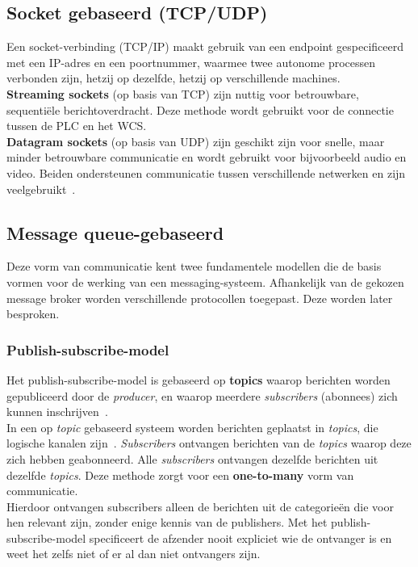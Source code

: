 \subsection{Socket gebaseerd (TCP/UDP)}
Een socket-verbinding (TCP/IP) maakt gebruik van een endpoint gespecificeerd met een IP-adres en een poortnummer, 
waarmee twee autonome processen verbonden zijn, hetzij op dezelfde, hetzij op verschillende machines.
\\
\textbf{Streaming sockets} (op basis van TCP) zijn nuttig voor betrouwbare, sequentiële berichtoverdracht.
Deze methode wordt gebruikt voor de connectie tussen de PLC en het WCS.
\\ 
\textbf{Datagram sockets} (op basis van UDP) zijn geschikt zijn voor snelle, maar minder betrouwbare communicatie en wordt gebruikt voor bijvoorbeeld audio en video.
Beiden ondersteunen communicatie tussen verschillende netwerken en zijn veelgebruikt~\autocite{Dinari2020}.

\subsection{Message queue-gebaseerd}
Deze vorm van communicatie kent twee fundamentele modellen die de basis vormen voor de werking van een messaging-systeem. 
Afhankelijk van de gekozen message broker worden verschillende protocollen toegepast. 
Deze worden later besproken.

\subsubsection{Publish-subscribe-model}
Het publish-subscribe-model is gebaseerd op \textbf{topics} waarop berichten worden gepubliceerd door de \emph{producer},
en waarop meerdere \emph{subscribers} (abonnees) zich kunnen inschrijven~\autocite{Dinari2020}.
\\
In een op \emph{topic} gebaseerd systeem worden berichten geplaatst in \emph{topics}, die logische kanalen zijn~\autocite{Dinari2020}.
\emph{Subscribers} ontvangen berichten van de \emph{topics} waarop deze zich hebben geabonneerd.
Alle \emph{subscribers} ontvangen dezelfde berichten uit dezelfde \emph{topics}. 
Deze methode zorgt voor een \textbf{one-to-many} vorm van communicatie.
\\
Hierdoor ontvangen subscribers alleen de berichten uit de categorieën die voor hen relevant zijn, zonder enige kennis van de publishers. 
Met het publish-subscribe-model specificeert de afzender nooit expliciet wie de ontvanger is en weet het zelfs niet of er al dan niet ontvangers zijn.

